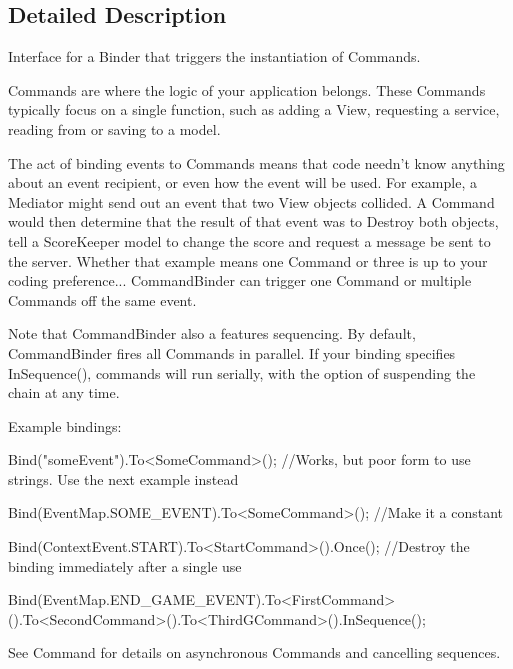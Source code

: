 \subsection{Detailed Description}
Interface for a Binder that triggers the instantiation of Commands. 

Commands are where the logic of your application belongs. These Commands typically focus on a single function, such as adding a View, requesting a service, reading from or saving to a model.

The act of binding events to Commands means that code needn't know anything about an event recipient, or even how the event will be used. For example, a Mediator might send out an event that two View objects collided. A Command would then determine that the result of that event was to Destroy both objects, tell a Score\-Keeper model to change the score and request a message be sent to the server. Whether that example means one Command or three is up to your coding preference... Command\-Binder can trigger one Command or multiple Commands off the same event.

Note that Command\-Binder also a features sequencing. By default, Command\-Binder fires all Commands in parallel. If your binding specifies {\ttfamily In\-Sequence()}, commands will run serially, with the option of suspending the chain at any time.

Example bindings\-: \begin{DoxyVerb}Bind("someEvent").To<SomeCommand>(); //Works, but poor form to use strings. Use the next example instead

Bind(EventMap.SOME_EVENT).To<SomeCommand>(); //Make it a constant

Bind(ContextEvent.START).To<StartCommand>().Once(); //Destroy the binding immediately after a single use

Bind(EventMap.END_GAME_EVENT).To<FirstCommand>().To<SecondCommand>().To<ThirdGCommand>().InSequence();
\end{DoxyVerb}


See Command for details on asynchronous Commands and cancelling sequences. 

